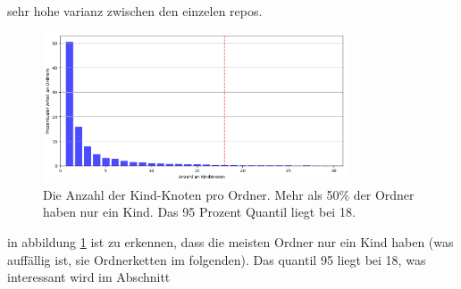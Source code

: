 sehr hohe varianz zwischen den einzelen repos. 

\begin{figure}
    \centering
    \includegraphics[width=0.8\textwidth]{images/datenanalyse/anzahlKindZuOrdner.png}
    \caption{Die Anzahl der Kind-Knoten pro Ordner. Mehr als 50\% der Ordner haben nur ein Kind. Das 95 Prozent Quantil liegt bei 18.}
    \label{fig:anzahlKindZuOrdner} 
\end{figure}

in abbildung \ref{fig:anzahlKindZuOrdner} ist zu erkennen, dass die meisten Ordner nur ein Kind haben (was auffällig ist, sie Ordnerketten im folgenden). Das quantil 95 liegt bei 18, was interessant wird im Abschnitt 

